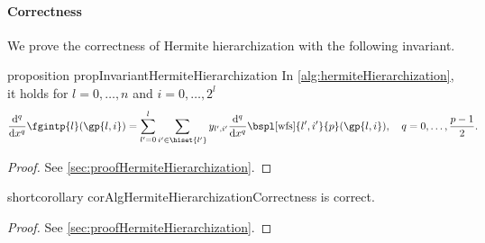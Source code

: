 \paragraph{Correctness}

We prove the correctness of Hermite hierarchization
with the following invariant.

\begin{restatable}{%
  proposition%
}{%
  propInvariantHermiteHierarchization%
}
  \label{prop:invariantHermiteHierarchization}
  In \cref{alg:hermiteHierarchization}, it holds
  for $l = 0, \dotsc, n$ and $i = 0, \dotsc, 2^l$
  \begin{equation}
    \label{eq:propInvariantHermiteHierarchization}
    \frac{\diff^q}{\dx^q} \fgintp{l}(\gp{l,i})
    = \sum_{l'=0}^l \sum_{i' \in \hiset{l'}}
    \linout{l',i'} \frac{\diff^q}{\dx^q}
    \bspl[\wfs]{l',i'}{p}(\gp{l,i}),\quad
    q = 0, \dotsc, \frac{p-1}{2}.
    \hspace*{-6mm}
  \end{equation}
\end{restatable}

\begin{proof}
  See \cref{sec:proofHermiteHierarchization}.
\end{proof}

\begin{restatable}{%
  shortcorollary%
}{%
  corAlgHermiteHierarchizationCorrectness%
}
  \label{cor:algHermiteHierarchizationCorrectness}
   is correct.
\end{restatable}

\begin{proof}
  See \cref{sec:proofHermiteHierarchization}.
\end{proof}



